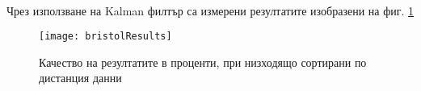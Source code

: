  \\
Чрез използване на Kalman филтър са измерени резултатите изобразени на фиг. \ref{fig:bristolResults}

\begin{figure}
    \centering
    \centerline{\texttt{[image: bristolResults]}}
    \caption{Качество на резултатите в проценти, при низходящо сортирани по дистанция данни}
    \label{fig:bristolResults}
\end{figure}